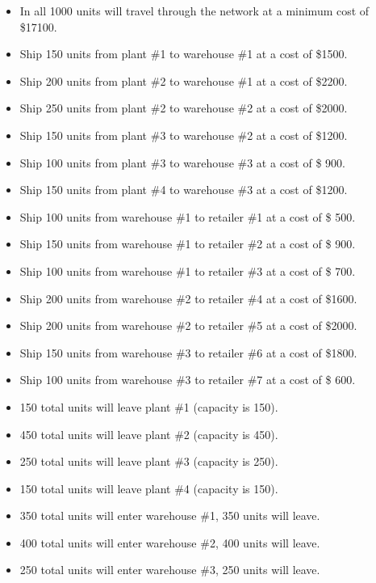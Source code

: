 \documentclass[../report/main.tex]{subfiles}
\begin{document}
\begin{itemize}
	\item In all 1000 units will travel through the network at a minimum cost of \$17100.
	\newline
	\item Ship 150 units from plant \#1 to warehouse \#1 at a cost of \$1500.
	\item Ship 200 units from plant \#2 to warehouse \#1 at a cost of \$2200.
	\item Ship 250 units from plant \#2 to warehouse \#2 at a cost of \$2000.
	\item Ship 150 units from plant \#3 to warehouse \#2 at a cost of \$1200.
	\item Ship 100 units from plant \#3 to warehouse \#3 at a cost of \$ 900.
	\item Ship 150 units from plant \#4 to warehouse \#3 at a cost of \$1200.
	\newline
	\item Ship 100 units from warehouse \#1 to retailer \#1 at a cost of \$ 500.
	\item Ship 150 units from warehouse \#1 to retailer \#2 at a cost of \$ 900.
	\item Ship 100 units from warehouse \#1 to retailer \#3 at a cost of \$ 700.
	\item Ship 200 units from warehouse \#2 to retailer \#4 at a cost of \$1600.
	\item Ship 200 units from warehouse \#2 to retailer \#5 at a cost of \$2000.
	\item Ship 150 units from warehouse \#3 to retailer \#6 at a cost of \$1800.
	\item Ship 100 units from warehouse \#3 to retailer \#7 at a cost of \$ 600.
	\newline
	\item 150 total units will leave plant \#1 (capacity is 150).
	\item 450 total units will leave plant \#2 (capacity is 450).
	\item 250 total units will leave plant \#3 (capacity is 250).
	\item 150 total units will leave plant \#4 (capacity is 150).
	\newline
	\item 350 total units will enter warehouse \#1, 350 units will leave.
	\item 400 total units will enter warehouse \#2, 400 units will leave.
	\item 250 total units will enter warehouse \#3, 250 units will leave.

\end{itemize}
\end{document}
